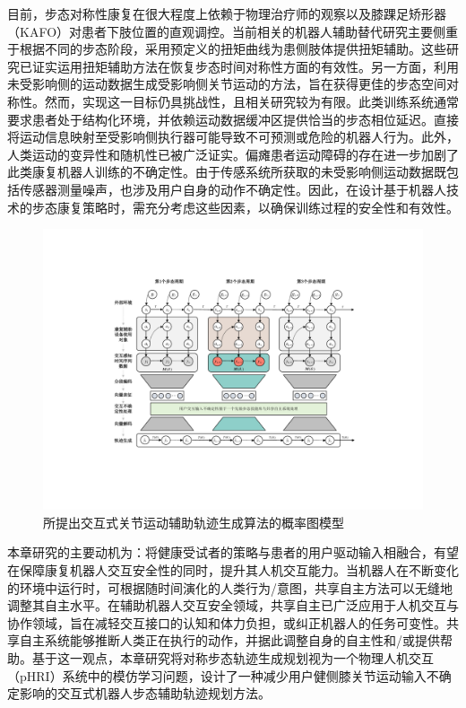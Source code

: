目前，步态对称性康复在很大程度上依赖于物理治疗师的观察以及膝踝足矫形器（KAFO）对患者下肢位置的直观调控\cite{abeNarrativeReviewAlternate2021}。当前相关的机器人辅助替代研究主要侧重于根据不同的步态阶段，采用预定义的扭矩曲线为患侧肢体提供扭矩辅助。这些研究已证实运用扭矩辅助方法在恢复步态时间对称性方面的有效性。另一方面，利用未受影响侧的运动数据生成受影响侧关节运动的方法，旨在获得更佳的步态空间对称性。然而，实现这一目标仍具挑战性，且相关研究较为有限。此类训练系统通常要求患者处于结构化环境，并依赖运动数据缓冲区提供恰当的步态相位延迟。直接将运动信息映射至受影响侧执行器可能导致不可预测或危险的机器人行为。此外，人类运动的变异性和随机性已被广泛证实\cite{vanbeersRoleExecutionNoise2004}。偏瘫患者运动障碍的存在进一步加剧了此类康复机器人训练的不确定性。由于传感系统所获取的未受影响侧运动数据既包括传感器测量噪声，也涉及用户自身的动作不确定性\cite{gopinathCustomizedHandlingUnintended2021}。因此，在设计基于机器人技术的步态康复策略时，需充分考虑这些因素，以确保训练过程的安全性和有效性。

\begin{figure}[htb]
  \centering\includegraphics[width=1\textwidth]{figures/5-Fig-Intro.pdf}
  \caption{所提出交互式关节运动辅助轨迹生成算法的概率图模型}
  \label{fig:5-Intro}
\end{figure}

本章研究的主要动机为：将健康受试者的策略与患者的用户驱动输入相融合，有望在保障康复机器人交互安全性的同时，提升其人机交互能力。当机器人在不断变化的环境中运行时，可根据随时间演化的人类行为/意图，共享自主方法可以无缝地调整其自主水平\cite{selvaggioAutonomyPhysicalHumanRobot2021a}。在辅助机器人交互安全领域，共享自主已广泛应用于人机交互与协作领域，旨在减轻交互接口的认知和体力负担\cite{dingHumanintheloopOptimizationHip2018}，或纠正机器人的任务可变性\cite{hagenowCorrectiveSharedAutonomy2021}。共享自主系统能够推断人类正在执行的动作，并据此调整自身的自主性和/或提供帮助。基于这一观点，本章研究将对称步态轨迹生成规划视为一个物理人机交互（pHRI）系统中的模仿学习问题，设计了一种减少用户健侧膝关节运动输入不确定影响的交互式机器人步态辅助轨迹规划方法。

